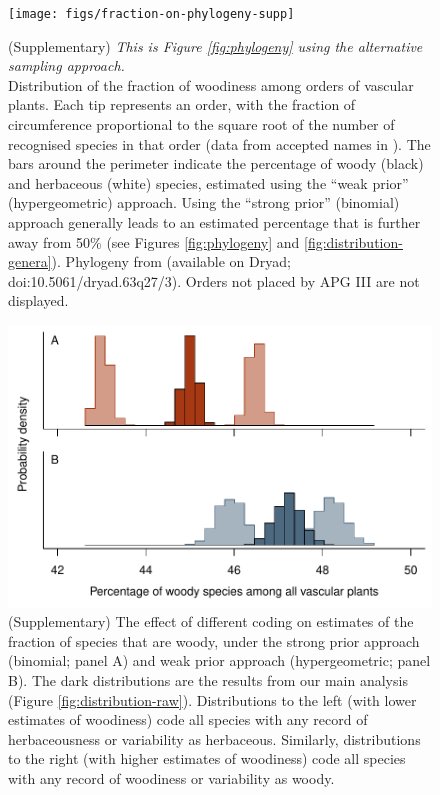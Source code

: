 \documentclass[a4paper,12pt]{article}
\begin{document}
\begin{figure}[p]
  \centering
  \texttt{[image: figs/fraction-on-phylogeny-supp]}

  \caption{(Supplementary)
    \textit{This is Figure \ref{fig:phylogeny} using the alternative
      sampling approach.}\\
    Distribution of the fraction of woodiness among orders of vascular
    plants.  Each tip represents an order, with the fraction of
    circumference proportional to the square root of the number of
    recognised species in that order (data from accepted names in
    \citet{ThePlantList}).  The bars around the perimeter indicate the
    percentage of woody (black) and herbaceous (white) species,
    estimated using the ``weak prior'' (hypergeometric) approach.
    Using the ``strong prior'' (binomial) approach generally leads to
    an estimated percentage that is further away from 50\% (see
    Figures \ref{fig:phylogeny} and \ref{fig:distribution-genera}).
    Phylogeny from \citet{Zanne} (available on Dryad; 
    doi:10.5061/dryad.63q27/3). Orders not placed by APG III
    \citep{APG3} are not displayed.}
  \label{fig:phylogeny-supp}
\end{figure}

\begin{figure}[p]
  \centering
  \includegraphics{figs/distribution-raw-errors}
  \caption{(Supplementary) The effect of different coding on estimates
    of the fraction of species that are woody, under the strong prior
    approach (binomial; panel A) and weak prior approach
    (hypergeometric; panel B).  The dark distributions are the results
    from our main analysis (Figure \ref{fig:distribution-raw}).
    Distributions to the left (with lower estimates of woodiness) code
    all species with any record of herbaceousness or variability as
    herbaceous.  Similarly, distributions to the right (with higher
    estimates of woodiness) code all species with any record of
    woodiness or variability as woody.}
  \label{fig:distribution-raw-errors}
\end{figure}
    
\end{document}
